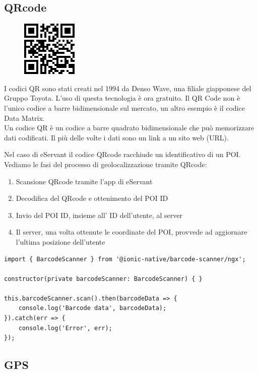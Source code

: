 \subsection{QRcode}
\begin{figure}[H]
    \centering  
    \includegraphics[scale=1]{img/cap2/barcode-qrcode}
\end{figure}
I codici QR sono stati creati nel 1994 da Denso Wave, una filiale giapponese del Gruppo Toyota.
L'uso di questa tecnologia è ora gratuito. Il QR Code non è l'unico codice a barre bidimensionale 
sul mercato, un altro esempio è il codice Data Matrix.
\\
Un codice QR è un codice a barre quadrato bidimensionale che può memorizzare dati codificati. 
Il più delle volte i dati sono un link a un sito web (URL).

Nel caso di eServant il codice QRcode racchiude un identificativo di un POI. \\
Vediamo le fasi del processo di geolocalizzazione tramite QRcode:

\begin{enumerate}
    \item Scansione QRcode tramite l'app di eServant
    \item Decodifica del QRcode e ottenimento del POI ID
    \item Invio del POI ID, insieme all' ID dell'utente, al server
    \item Il server, una volta ottenute le coordinate del POI, provvede ad aggiornare l'ultima posizione dell'utente
\end{enumerate}

\begin{lstlisting}
import { BarcodeScanner } from '@ionic-native/barcode-scanner/ngx';

constructor(private barcodeScanner: BarcodeScanner) { }

this.barcodeScanner.scan().then(barcodeData => {
    console.log('Barcode data', barcodeData);
}).catch(err => {
    console.log('Error', err);
});
\end{lstlisting}

\subsection{GPS}


